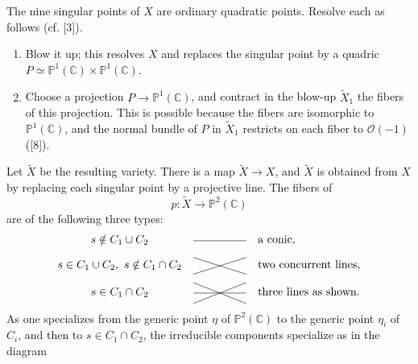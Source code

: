 \documentclass[10pt]{article}
\newcommand{\C}{\mathbb C}
\newcommand{\Pj}{\mathbb P}
\begin{document}
The nine singular points of \(X\) are ordinary quadratic points. Resolve each as follows (cf. [3]).
\begin{enumerate}[label=\alph*)]
\item Blow it up; this resolves \(X\) and replaces the singular point by a quadric \(P\simeq\Pj^1(\C)\times\Pj^1(\C)\).
\item Choose a projection \(P\to\Pj^1(\C)\), and contract in the blow-up \(\widetilde X_1\) the fibers of this projection. This is possible because the fibers are isomorphic to \(\Pj^1(\C)\), and the normal bundle of \(P\) in \(\widetilde X_1\) restricts on each fiber to \(\mathcal O(-1)\) ([8]).
\end{enumerate}
Let \(\widetilde X\) be the resulting variety. There is a map \(\widetilde X\to X\), and \(\widetilde X\) is obtained from \(X\) by replacing each singular point by a projective line. The fibers of
\[
p:\widetilde X\longrightarrow\Pj^2(\C)
\]
are of the following three types:
\[
\begin{array}{c@{\quad}c@{\quad}l}
s\notin C_1\cup C_2 &
\begin{tikzpicture}[baseline=-0.45ex,scale=0.72]
  \draw (-1.15,0)--(1.15,0);
\end{tikzpicture}
& \text{a conic},\\[0.9em]
s\in C_1\cup C_2,\ s\notin C_1\cap C_2 &
\begin{tikzpicture}[baseline=-0.45ex,scale=0.72]
  \draw (-1.15,-.36)--(1.15,.36);
  \draw (-1.15,.36)--(1.15,-.36);
\end{tikzpicture}
& \text{two concurrent lines},\\[0.9em]
s\in C_1\cap C_2 &
\begin{tikzpicture}[baseline=-0.45ex,scale=0.72]
  \draw (-1.15,-.45)--(1.15,.45);
  \draw (-1.15,.45)--(1.15,-.45);
  \draw (-1.15,0)--(1.15,0);
\end{tikzpicture}
& \text{three lines as shown.}
\end{array}
\]
As one specializes from the generic point \(\eta\) of \(\Pj^2(\C)\) to the generic point \(\eta_i\) of \(C_i\), and then to \(s\in C_1\cap C_2\), the irreducible components specialize as in the diagram
\end{document}
